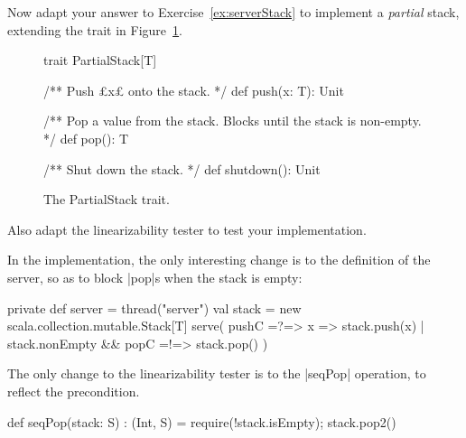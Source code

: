 \begin{questionS}
\label{ex:partialStack}
Now adapt your answer to Exercise~\ref{ex:serverStack} to implement a
\emph{partial} stack, extending the  trait in Figure~\ref{fig:PartialStack}.
%
\begin{figure}
\begin{scala}
trait PartialStack[T]{
  /** Push £x£ onto the stack. */
  def push(x: T): Unit

  /** Pop a value from the stack.  Blocks until the stack is non-empty. */
  def pop(): T

  /** Shut down the stack. */
  def shutdown(): Unit
}
\end{scala}
\caption{The {\scalashape PartialStack} trait.}
\label{fig:PartialStack}
\end{figure}
%
Also adapt the linearizability tester to test your implementation.
\end{questionS}


\begin{answerS}
In the implementation, the only interesting change is to the definition of the
server, so as to block |pop|s when the stack is empty:
%
\begin{scala}
  private def server = thread("server"){
    val stack = new scala.collection.mutable.Stack[T]
    serve(
      pushC =?=> { x => stack.push(x) }
      | stack.nonEmpty && popC =!=> stack.pop()
    )
  }
\end{scala}

The only change to the linearizability tester is to the |seqPop| operation, to
reflect the precondition. 
%
\begin{scala}
  def seqPop(stack: S) : (Int, S) = {
    require(!stack.isEmpty); stack.pop2()
  }
\end{scala}
\end{answerS}
